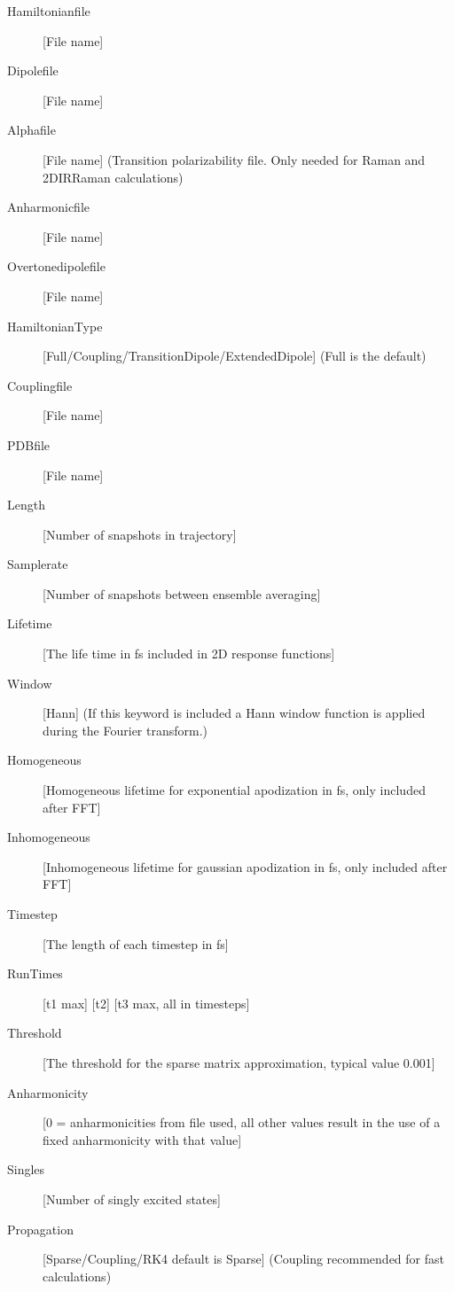 \begin{description}
\item [Hamiltonianfile] [File name]
\item [Dipolefile] [File name]
\item [Alphafile] [File name] (Transition polarizability file. Only needed for Raman and 2DIRRaman calculations)
\item [Anharmonicfile] [File name]
\item [Overtonedipolefile] [File name]
\item [HamiltonianType] [Full/Coupling/TransitionDipole/ExtendedDipole] (Full is the default)
\item [Couplingfile] [File name]
\item [PDBfile] [File name]
\item [Length] [Number of snapshots in trajectory] 
\item [Samplerate] [Number of snapshots between ensemble averaging]
\item [Lifetime] [The life time in fs included in 2D response functions]
\item [Window] [Hann] (If this keyword is included a Hann window function is applied during the Fourier transform.)
\item [Homogeneous] [Homogeneous lifetime for exponential apodization in fs, only included after FFT]
\item [Inhomogeneous] [Inhomogeneous lifetime for gaussian apodization in fs, only included after FFT]
\item [Timestep] [The length of each timestep in fs]
\item [RunTimes] [t1 max] [t2] [t3 max, all in timesteps]
\item [Threshold][The threshold for the sparse matrix approximation, typical value 0.001]
\item [Anharmonicity] [0 = anharmonicities from file used, all other values result in the use of a fixed anharmonicity with that value]
\item [Singles] [Number of singly excited states]
\item [Propagation] [Sparse/Coupling/RK4 default is Sparse] (Coupling recommended for fast calculations)

\end{description}
